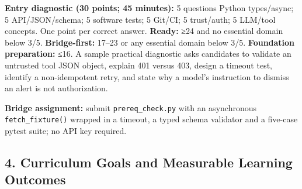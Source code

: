 \documentclass[
  10pt,
]{article}
\begin{document}
\textbf{Entry diagnostic (30 points; 45 minutes):} 5 questions Python
types/async; 5 API/JSON/schema; 5 software tests; 5 Git/CI; 5
trust/auth; 5 LLM/tool concepts. One point per correct answer.
\textbf{Ready:} ≥24 and no essential domain below 3/5.
\textbf{Bridge-first:} 17--23 or any essential domain below 3/5.
\textbf{Foundation preparation:} ≤16. A sample practical diagnostic asks
candidates to validate an untrusted tool JSON object, explain 401 versus
403, design a timeout test, identify a non-idempotent retry, and state
why a model's instruction to dismiss an alert is not authorization.

\textbf{Bridge assignment:} submit \texttt{prereq\_check.py} with an
asynchronous \texttt{fetch\_fixture()} wrapped in a timeout, a typed
schema validator and a five-case pytest suite; no API key required.

\subsection{4. Curriculum Goals and Measurable Learning
Outcomes}\label{curriculum-goals-and-measurable-learning-outcomes}
\end{document}
